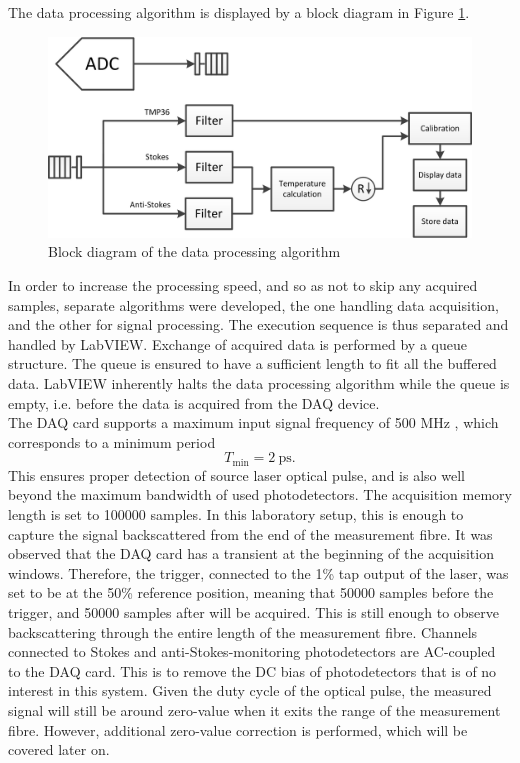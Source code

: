 \documentclass{standalone}
\begin{document}
The data processing algorithm is displayed by a block diagram in Figure \ref{fig:program_block}.
\begin{figure}[h]
	\centering
	\includegraphics[width=\textwidth]{program_block}
	\caption{Block diagram of the data processing algorithm}
	\label{fig:program_block}
\end{figure}
In order to increase the processing speed, and so as not to skip any acquired samples, separate algorithms were developed, the one handling data acquisition, and the other for signal processing. The execution sequence is thus separated and handled by LabVIEW. Exchange of acquired data is performed by a queue structure. The queue is ensured to have a sufficient length to fit all the buffered data. LabVIEW inherently halts the data processing algorithm while the queue is empty, i.e. before the data is acquired from the DAQ device. \\

The DAQ card supports a maximum input signal frequency of 500 MHz \cite{datasheet:daq}, which corresponds to a minimum period
\begin{equation}
T_\textrm{min} = \SI{2}{\pico \second} \textrm{.}
\end{equation}
This ensures proper detection of source laser optical pulse, and is also well beyond the maximum bandwidth of used photodetectors. The acquisition memory length is set to 100000 samples. In this laboratory setup, this is enough to capture the signal backscattered from the end of the measurement fibre. It was observed that the DAQ card has a transient at the beginning of the acquisition windows. Therefore, the trigger, connected to the 1\% tap output of the laser, was set to be at the 50\% reference position, meaning that 50000 samples before the trigger, and 50000 samples after will be acquired. This is still enough to observe backscattering through the entire length of the measurement fibre. Channels connected to Stokes and anti-Stokes-monitoring photodetectors are AC-coupled to the DAQ card. This is to remove the DC bias of photodetectors that is of no interest in this system. Given the duty cycle of the optical pulse, the measured signal will still be around zero-value when it exits the range of the measurement fibre. However, additional zero-value correction is performed, which will be covered later on. \\
\end{document}
